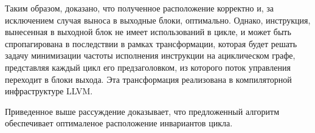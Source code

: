 Таким образом, доказано, что полученное расположение корректно и, за исключением случая выноса в выходные блоки, оптимально.
Однако, инструкция, вынесенная в выходной блок не имеет использований в цикле, и может быть спропагирована в последствии в рамках трансформации, которая будет решать задачу минимизации частоты исполнения инструкции на ациклическом графе, представляя каждый цикл его предзаголовком, из которого поток управления переходит в блоки выхода.
Эта трансформация реализована в компиляторной инфраструктуре LLVM.

Приведенное выше рассуждение доказывает, что предложенный алгоритм обеспечивает оптималеное расположение инвариантов цикла.

\newpage
